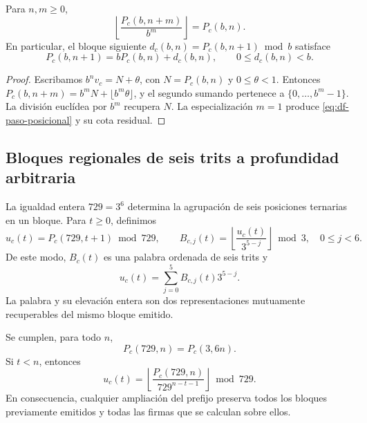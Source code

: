 \begin{proposition}
\label{prop:df-prefijos-compatibles}
Para \(n,m\geq0\),
\begin{equation}
 \left\lfloor\frac{P_c(b,n+m)}{b^m}\right\rfloor=P_c(b,n).
 \label{eq:df-truncamiento}
\end{equation}
En particular, el bloque siguiente
\(d_c(b,n)=P_c(b,n+1)\bmod b\) satisface
\begin{equation}
 P_c(b,n+1)=bP_c(b,n)+d_c(b,n),\qquad 0\leq d_c(b,n)<b.
 \label{eq:df-paso-posicional}
\end{equation}
\end{proposition}

\begin{proof}
Escribamos \(b^n v_c=N+\theta\), con
\(N=P_c(b,n)\) y \(0\leq\theta<1\). Entonces
\(P_c(b,n+m)=b^mN+\lfloor b^m\theta\rfloor\), y el segundo sumando
pertenece a \(\{0,\ldots,b^m-1\}\). La división euclídea por \(b^m\)
recupera \(N\). La especialización \(m=1\) produce
\eqref{eq:df-paso-posicional} y su cota residual.
\end{proof}

\subsection{Bloques regionales de seis trits a profundidad arbitraria}
\label{subsec:df-bloques-arbitrarios}


La igualdad entera \(729=3^6\) determina la agrupación de seis posiciones
ternarias en un bloque. Para \(t\geq0\), definimos
\begin{equation}
 u_c(t)=P_c(729,t+1)\bmod729,
 \qquad
 B_{c,j}(t)=
 \left\lfloor\frac{u_c(t)}{3^{5-j}}\right\rfloor\bmod3,
 \quad 0\leq j<6.
 \label{eq:df-bloque-y-banda}
\end{equation}
De este modo, \(B_c(t)\) es una palabra ordenada de seis trits y
\begin{equation}
 u_c(t)=\sum_{j=0}^{5}B_{c,j}(t)3^{5-j}.
 \label{eq:df-elevacion-banda}
\end{equation}
La palabra y su elevación entera son dos representaciones mutuamente
recuperables del mismo bloque emitido.

\begin{theorem}
\label{thm:df-bloque-estable}
Se cumplen, para todo \(n\),
\[
 P_c(729,n)=P_c(3,6n).
\]
Si \(t<n\), entonces
\begin{equation}
 u_c(t)=
 \left\lfloor\frac{P_c(729,n)}{729^{n-t-1}}\right\rfloor\bmod729.
 \label{eq:df-bloque-prefijo-largo}
\end{equation}
En consecuencia, cualquier ampliación del prefijo preserva todos los
bloques previamente emitidos y todas las firmas que se calculan sobre ellos.
\end{theorem}

